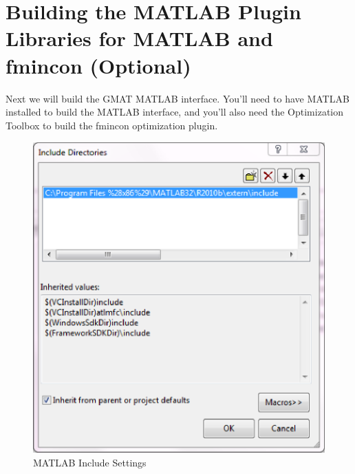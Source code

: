 \documentclass[letterpaper,10pt]{article}%
\begin{document}
\section{Building the MATLAB Plugin Libraries for MATLAB and fmincon (Optional)}

Next we will build the GMAT MATLAB interface.  You'll need to have MATLAB installed to build the MATLAB interface, and you'll also need the Optimization Toolbox to build the fmincon optimization plugin.

\begin{figure}
	\centering
		\includegraphics{SettingIncludeFolder.eps}
	\caption{MATLAB Include Settings}
	\label{fig:SettingIncludeFolder}
\end{figure}
\end{document}
